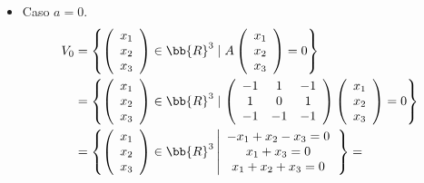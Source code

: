 \begin{ejercicio}
\begin{enumerate}
\begin{itemize}
            \item Caso $a=0$.
           \begin{equation*}\begin{split}
               V_0 & = \left\{ \left(\begin{array}{c}
                    x_1 \\
                    x_2 \\
                    x_3
               \end{array}\right) \in \bb{R}^3 \mid A\left(\begin{array}{c}
                    x_1 \\
                    x_2 \\
                    x_3
               \end{array}\right) = 0 \right\} \\
               & = \left\{ \left(\begin{array}{c}
                    x_1 \\
                    x_2 \\
                    x_3
               \end{array}\right) \in \bb{R}^3 \mid \left( \begin{array}{ccc}
                -1 & 1 & -1 \\
                1 & 0 & 1 \\
                -1 & -1 & -1 \\
            \end{array}\right) \left(\begin{array}{c}
                    x_1 \\
                    x_2 \\
                    x_3
               \end{array}\right) = 0 \right\} \\
               & = \left\{ \left(\begin{array}{c}
                    x_1 \\
                    x_2  \\
                    x_3
               \end{array}\right) \in \bb{R}^3 \left|
               \begin{array}{c}
                   -x_1+x_2-x_3 = 0  \\
                    x_1+x_3 = 0\\
                    x_1+x_2+x_3 = 0
               \end{array}\right.\right\} =

\end{split}
\end{equation*}
\end{itemize}
\end{enumerate}
\end{ejercicio}
